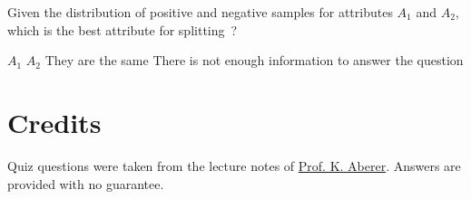 \documentclass[12pt,a4paper]{exam} %
\newcommand{\staff}{\href{http://people.epfl.ch//karl.aberer}{Prof. K. Aberer}}
\begin{document}
\begin{flushleft}
\begin{multicols*}{2}
\begin{questions}

%
\question Given the distribution of positive and negative samples for attributes $A_1$ and $A_2$, which is the best attribute for splitting~?
\begin{checkboxes}
\choice $A_1$
\choice $A_2$
\choice They are the same
\choice There is not enough information to answer the question
\end{checkboxes}

\end{questions}
\end{multicols*}
\end{flushleft}


\section*{Credits}
Quiz questions were taken from the lecture notes of \staff. Answers are provided with no guarantee.%

%
\end{document}
